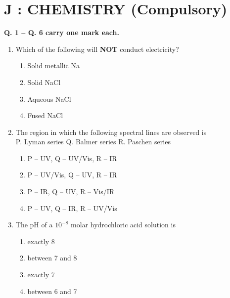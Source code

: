 \documentclass[journal,12pt,onecolumn]{IEEEtran}
\begin{document}
\section*{\centering J : CHEMISTRY (Compulsory)}

\noindent\textbf{Q. 1 -- Q. 6 carry one mark each.}

\begin{enumerate}
    \item Which of the following will \textbf{NOT} conduct electricity?  
    \begin{multicols}{2}
    \begin{enumerate}[label=(\Alph*)]
        \item Solid metallic Na  
        \item Solid NaCl  
        \item Aqueous NaCl  
        \item Fused NaCl  
    \end{enumerate}
    \end{multicols}

    \item The region in which the following spectral lines are observed is \\
    P. Lyman series \hspace{1cm} Q. Balmer series \hspace{1cm} R. Paschen series  
    \begin{multicols}{2}
    \begin{enumerate}[label=(\Alph*)]
        \item P -- UV, Q -- UV/Vis, R -- IR  
        \item P -- UV/Vis, Q -- UV, R -- IR  
        \item P -- IR, Q -- UV, R -- Vis/IR  
        \item P -- UV, Q -- IR, R -- UV/Vis  
    \end{enumerate}
    \end{multicols}

    \item The pH of a $10^{-8}$ molar hydrochloric acid solution is  
    \begin{multicols}{2}
    \begin{enumerate}[label=(\Alph*)]
        \item exactly 8  
        \item between 7 and 8  
        \item exactly 7  
        \item between 6 and 7  
    \end{enumerate}
    \end{multicols}


\end{enumerate}
\end{document}
